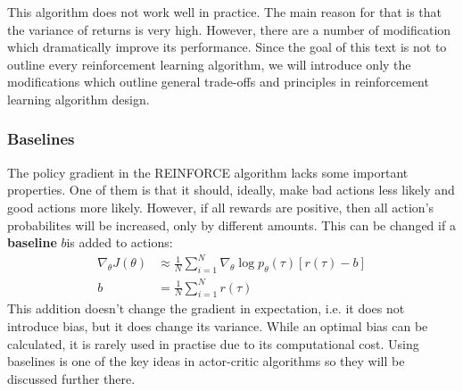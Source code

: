 
This algorithm does not work well in practice.
The main reason for that is that the variance of returns
is very high. 
However, there are a number of modification
which dramatically improve its performance.
Since the goal of this text is not to outline every reinforcement learning algorithm,
we will introduce only the modifications which outline
general trade-offs and principles in reinforcement learning algorithm design.

\subsubsection{Baselines}
The policy gradient in the REINFORCE algorithm lacks some important properties.
One of them is that it should, ideally, make bad actions less likely
and good actions more likely. 
However, if all rewards are positive, then all action's probabilites will be increased,
only by different amounts.
This can be changed if a \textbf{baseline} $ b  $is added to actions:
\begin{align}
		\nabla_\theta J(\theta) &\approx 
		\frac{1}{N} \sum_{i=1}^{N}
		\nabla_\theta \log p_\theta (\tau) [ r(\tau) - b] \\
		b &= \frac{1}{N} \sum_{i=1}^{N} r(\tau)
\end{align}
This addition doesn't change the gradient in expectation, i.e. it does not
introduce bias,
but it does change its variance.
While an optimal bias can be calculated, it is rarely used in practise due
to its computational cost.
Using baselines is one of the key ideas in actor-critic algorithms
so they will be discussed further there.

